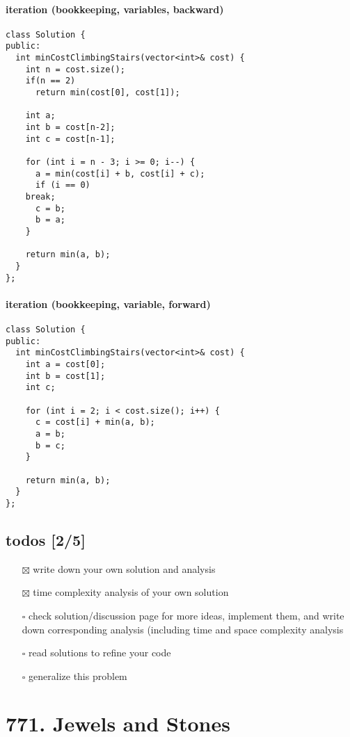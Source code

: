 \documentclass[11pt]{article}
\begin{document}
\paragraph{iteration (bookkeeping, variables, backward)}
\label{sec:org0aae5a5}
\begin{verbatim}
class Solution {
public:
  int minCostClimbingStairs(vector<int>& cost) {
    int n = cost.size();
    if(n == 2)
      return min(cost[0], cost[1]);

    int a;
    int b = cost[n-2];
    int c = cost[n-1];

    for (int i = n - 3; i >= 0; i--) {
      a = min(cost[i] + b, cost[i] + c);
      if (i == 0)
	break;
      c = b;
      b = a;
    }

    return min(a, b);
  }
};
\end{verbatim}
\paragraph{iteration (bookkeeping, variable, forward)}
\label{sec:org1e75244}
\begin{verbatim}
class Solution {
public:
  int minCostClimbingStairs(vector<int>& cost) {   
    int a = cost[0];
    int b = cost[1];
    int c;

    for (int i = 2; i < cost.size(); i++) {
      c = cost[i] + min(a, b);
      a = b;
      b = c;
    }          

    return min(a, b);
  }
};
\end{verbatim}
\subsection{todos [2/5]}
\label{sec:org4b9d055}
\begin{itemize}
\item[{$\boxtimes$}] write down your own solution and analysis
\item[{$\boxtimes$}] time complexity analysis of your own solution
\item[{$\square$}] check solution/discussion page for more ideas, implement them, and write down corresponding analysis (including time and space complexity analysis
\item[{$\square$}] read solutions to refine your code
\item[{$\square$}] generalize this problem
\end{itemize}
\section{771. Jewels and Stones}
\label{sec:org6959e6b}
\end{document}
